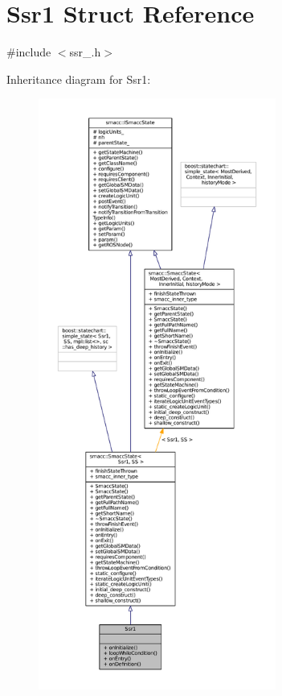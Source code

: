 \hypertarget{structSsr1}{}\section{Ssr1 Struct Reference}
\label{structSsr1}


{\ttfamily \#include $<$ssr\+\_.\+h$>$}



Inheritance diagram for Ssr1\+:
\nopagebreak
\begin{figure}[H]
\begin{center}
\leavevmode
\includegraphics[height=550pt]{structSsr1__inherit__graph}
\end{center}
\end{figure}


